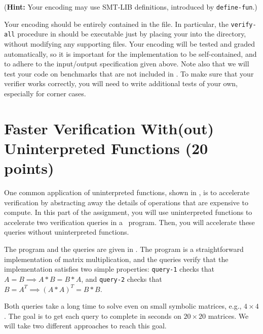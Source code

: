 \documentclass{handout}
\begin{document}
\begin{questions}
\medskip
(\textbf{Hint:}  Your encoding may use SMT-LIB definitions, introduced by \texttt{define-fun}.)
\medskip

Your encoding should be entirely contained in the  file.
In particular, the \texttt{verify-all} procedure in  should
be executable just by placing your  into the 
directory, without modifying any supporting files.  Your encoding will be tested
and graded automatically, so it is important for the implementation to be
self-contained, and to adhere to the input/output specification given above.
Note also that we will test your code on benchmarks that are not included in
.  To make sure that your verifier works correctly, you
will need to write additional tests of your own, especially for corner cases.





\end{questions}


\section{Faster Verification With(out) Uninterpreted Functions (20 points)}

One common application of uninterpreted functions, shown in , is to
accelerate verification by abstracting away the details of operations that are
expensive to compute.  In this part of the assignment, you will use
uninterpreted functions to accelerate two verification queries in a \rosette\
program.  Then, you will accelerate these queries without uninterpreted
functions.

The program and the queries are given in .  The program is
a straightforward implementation of matrix multiplication, and the queries
verify that the implementation satisfies two simple properties: \texttt{query-1}
checks that $A = B \implies A*B = B*A$, and \texttt{query-2} checks that $B =
A^T \implies (A*A)^T = B*B$.

Both queries take a long time to solve even on small symbolic matrices, e.g.,
$4\times4$.  The goal is to get each query to complete in seconds on
$20\times20$ matrices.  We will take two different approaches to reach this
goal.
\end{document}
